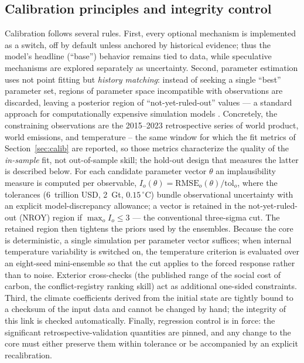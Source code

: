 \documentclass[a4paper,fleqn]{cas-sc}
\begin{document}
\subsection{Calibration principles and integrity control}

Calibration follows several rules. First, every optional mechanism is implemented as a switch, off
by default unless anchored by historical evidence; thus the model's headline (``base'') behavior
remains tied to data, while speculative mechanisms are explored separately as uncertainty. Second,
parameter estimation uses not point fitting but \emph{history matching}: instead of seeking a single
``best'' parameter set, regions of parameter space incompatible with observations are discarded,
leaving a posterior region of ``not-yet-ruled-out'' values --- a standard approach for
computationally expensive simulation models \citep{williamson2013}. Concretely, the constraining
observations are the 2015--2023 retrospective series of world product, world emissions, and
temperature -- the same window for which the fit metrics of Section~\ref{sec:calib} are
reported, so those metrics characterize the quality of the \emph{in-sample} fit, not
out-of-sample skill; the hold-out design that measures the latter is described below. For each candidate parameter vector $\theta$ an implausibility measure is computed
per observable, $I_o(\theta) = \mathrm{RMSE}_o(\theta) / \mathrm{tol}_o$, where the tolerances
(6~trillion USD, 2~Gt, $0.15\,^\circ$C) bundle observational uncertainty with an explicit
model-discrepancy allowance; a vector is retained in the not-yet-ruled-out (NROY) region if
$\max_o I_o \le 3$ --- the conventional three-sigma cut. The retained region then tightens the
priors used by the ensembles. Because the core is deterministic, a single simulation per parameter
vector suffices; when internal temperature variability is switched on, the temperature criterion
is evaluated over an eight-seed mini-ensemble so that the cut applies to the forced response
rather than to noise. Exterior cross-checks (the published range of the social cost of carbon,
the conflict-registry ranking skill) act as additional one-sided constraints. Third, the climate coefficients
derived from the initial state are tightly bound to a checksum of the input data and cannot be
changed by hand; the integrity of this link is checked automatically. Finally, regression control is
in force: the significant retrospective-validation quantities are pinned, and any change to the core
must either preserve them within tolerance or be accompanied by an explicit recalibration.
\end{document}
